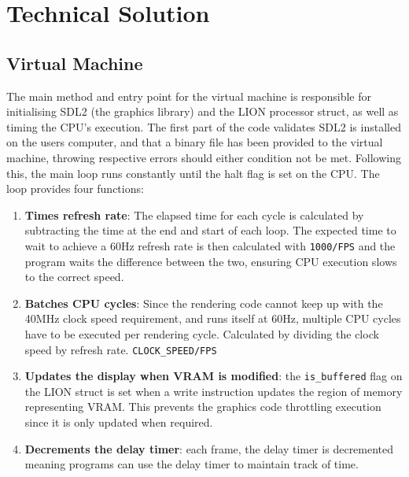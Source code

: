 \section{Technical Solution}



\subsection{Virtual Machine}

The main method and entry point for the virtual machine is responsible for initialising SDL2 (the graphics library) and the LION processor struct, as well as timing the CPU's execution. The first part of the code validates SDL2 is installed on the users computer, and that a binary file has been provided to the virtual machine, throwing respective errors should either condition not be met. Following this, the main loop runs constantly until the halt flag is set on the CPU. The loop provides four functions:

\begin{enumerate}
  \item \textbf{Times refresh rate}: The elapsed time for each cycle is calculated by subtracting the time at the end and start of each loop. The expected time to wait to achieve a 60Hz refresh rate is then calculated with \texttt{1000/FPS} and the program waits the difference between the two, ensuring CPU execution slows to the correct speed.
  \item \textbf{Batches CPU cycles}: Since the rendering code cannot keep up with the 40MHz clock speed requirement, and runs itself at 60Hz, multiple CPU cycles have to be executed per rendering cycle. Calculated by dividing the clock speed by refresh rate. \texttt{CLOCK\_SPEED/FPS}
  \item \textbf{Updates the display when VRAM is modified}: the \texttt{is\_buffered} flag on the LION struct is set when a write instruction updates the region of memory representing VRAM. This prevents the graphics code throttling execution since it is only updated when required. 
  \item \textbf{Decrements the delay timer}: each frame, the delay timer is decremented meaning programs can use the delay timer to maintain track of time.
\end{enumerate}

